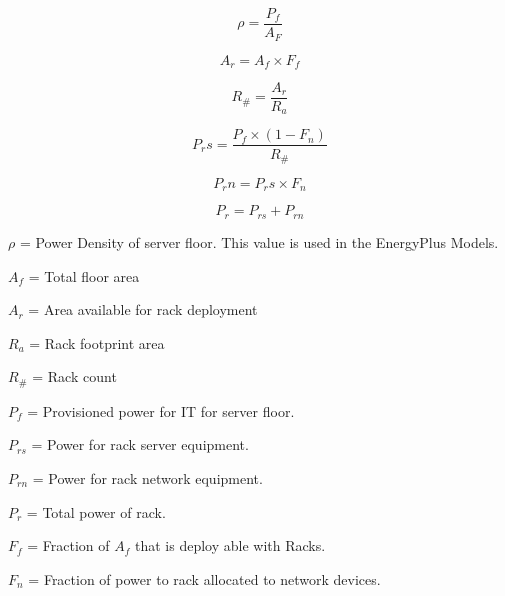     \begin{equation} 
    \label{eq:floor_per_density}
        \rho= \frac{P_{f}}{A_{F}}
    \end{equation}
    
    \begin{equation} 
    \label{eq:area_for_racks}
        A_{r}= A_{f} \times F_{f}
    \end{equation}
    
    \begin{equation} 
    \label{eq:rack_count}
        R_{\#}= \frac{A_{r}}{R_{a}}
    \end{equation}
    
    \begin{equation} 
    \label{eq:rack_power_server}
        P_rs = \frac{P_f \times (1-F_{n})}{R_{\#}}
    \end{equation} 
    
    \begin{equation} 
    \label{eq:rack_power_network}    
        P_rn = P_rs \times F_{n}
    \end{equation} 
     
    \begin{equation} 
    \label{eq:rack_power} 
        P_r = P_{rs} + P_{rn}
    \end{equation} 
    
    \begin{small}
    \begin{center}
    
    $\rho$ = Power Density of server floor. This value is used in the EnergyPlus Models.
    
    $A_{f}$ = Total floor area
    
    $A_{r}$ = Area available for rack deployment
    
    $R_{a}$ = Rack footprint area
    
    $R_{\#}$ = Rack count
    
    $P_{f}$ = Provisioned power for IT for server floor.
    
    $P_{rs}$ = Power for rack server equipment.
    
    $P_{rn}$ = Power for rack network equipment.
    
    $P_{r}$ = Total power of rack.
    
    $F_{f}$ = Fraction of $A_{f}$ that is deploy able with Racks.
    
    $F_{n}$ = Fraction of power to rack allocated to network devices. 
    
    \end{center}
    \end{small}